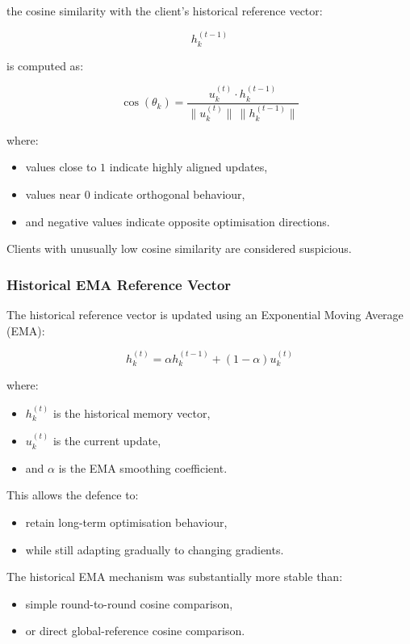 the cosine similarity with the client's historical reference vector:

\[
h_k^{(t-1)}
\]

is computed as:

\[
\cos(\theta_k)
=
\frac{
u_k^{(t)}
\cdot
h_k^{(t-1)}
}{
\|u_k^{(t)}\|
\,
\|h_k^{(t-1)}\|
}
\]

where:
\begin{itemize}
    \item values close to \(1\) indicate highly aligned updates,
    \item values near \(0\) indicate orthogonal behaviour,
    \item and negative values indicate opposite optimisation directions.
\end{itemize}

Clients with unusually low cosine similarity are considered suspicious.

\subsubsection*{Historical EMA Reference Vector}

The historical reference vector is updated using an Exponential Moving Average (EMA):

\[
h_k^{(t)}
=
\alpha
h_k^{(t-1)}
+
(1-\alpha)
u_k^{(t)}
\]

where:
\begin{itemize}
    \item \(h_k^{(t)}\) is the historical memory vector,
    \item \(u_k^{(t)}\) is the current update,
    \item and \(\alpha\) is the EMA smoothing coefficient.
\end{itemize}

This allows the defence to:
\begin{itemize}
    \item retain long-term optimisation behaviour,
    \item while still adapting gradually to changing gradients.
\end{itemize}

The historical EMA mechanism was substantially more stable than:
\begin{itemize}
    \item simple round-to-round cosine comparison,
    \item or direct global-reference cosine comparison.
\end{itemize}

